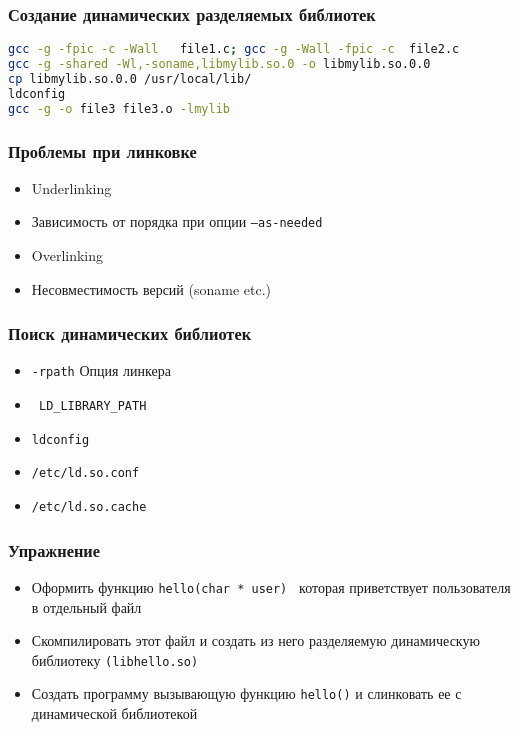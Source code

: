 \begin{frame}[fragile]
  \frametitle{Создание динамических разделяемых библиотек}
\begin{lstlisting}[language=sh]
gcc -g -fpic -c -Wall   file1.c; gcc -g -Wall -fpic -c  file2.c
gcc -g -shared -Wl,-soname,libmylib.so.0 -o libmylib.so.0.0 
cp libmylib.so.0.0 /usr/local/lib/
ldconfig 
gcc -g -o file3 file3.o -lmylib
\end{lstlisting}
\end{frame}

\begin{frame}
 \frametitle{Проблемы при линковке}
 \begin{itemize}
   \item Underlinking
   \item Зависимость от порядка при опции {\tt --as-needed} 
   \item Overlinking
   \item Несовместимость версий (soname etc.)
 \end{itemize}
\end{frame}

\begin{frame}[fragile]
  \frametitle{Поиск динамических библиотек}
  \begin{itemize}
    \item {\tt -rpath} Опция линкера
    \item \verb+ LD_LIBRARY_PATH +
    \item {\tt ldconfig}
    \item {\tt /etc/ld.so.conf}
    \item {\tt /etc/ld.so.cache}
  \end{itemize}
\end{frame}

\begin{frame}
  \frametitle{Упражнение}
  \begin{itemize}
    \item Оформить функцию {\tt hello(char * user) } которая приветствует пользователя в отдельный файл
    \item Скомпилировать этот файл и создать из него разделяемую динамическую библиотеку {\tt (libhello.so)}
    \item Создать программу вызывающую функцию {\tt hello()} и слинковать ее с динамической библиотекой
  \end{itemize}
\end{frame}

